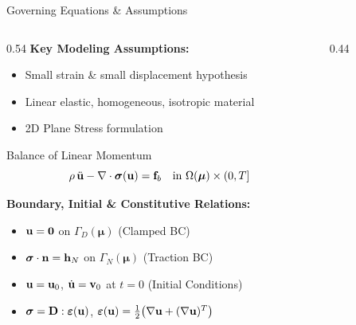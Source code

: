 \begin{frame}{Governing Equations \& Assumptions}
  \begin{columns}[T]
    \begin{column}{0.54\textwidth}
      \small
      \textbf{Key Modeling Assumptions:}
      \begin{itemize}
        \setlength{\itemsep}{2pt}
        \item Small strain \& small displacement hypothesis
        \item Linear elastic, homogeneous, isotropic material
        \item 2D Plane Stress formulation
      \end{itemize}

      \vspace{0.1cm}
      \begin{block}{Balance of Linear Momentum}
        \vspace{-0.15cm}
        \[
          \rho\,\ddot{\mathbf{u}} - \nabla \cdot \boldsymbol{\sigma}(\mathbf{u}) = \mathbf{f}_b \quad \text{in } \Omega(\boldsymbol{\mu}) \times (0,T]
        \]
      \end{block}
      
      \par\vspace{0.1cm}
      \textbf{Boundary, Initial \& Constitutive Relations:}
      \begin{itemize}
        \setlength{\itemsep}{2pt}
        \item $\mathbf{u} = \mathbf{0}$ on $\Gamma_D(\boldsymbol{\mu})$ \hfill (Clamped BC)
        \item $\boldsymbol{\sigma}\cdot\mathbf{n} = \mathbf{h}_N$ on $\Gamma_N(\boldsymbol{\mu})$ \hfill (Traction BC)
        \item $\mathbf{u} = \mathbf{u}_0$, $\dot{\mathbf{u}} = \mathbf{v}_0$ at $t=0$ \hfill (Initial Conditions)
        \item $\boldsymbol{\sigma} = \mathbf{D}:\boldsymbol{\varepsilon}(\mathbf{u})$, \quad $\boldsymbol{\varepsilon}(\mathbf{u}) = \tfrac{1}{2}\!\left(\nabla\mathbf{u} + (\nabla\mathbf{u})^T\right)$
      \end{itemize}
    \end{column}
    
    \begin{column}{0.44\textwidth}
      \centering
\end{column}
\end{columns}
\end{frame}

